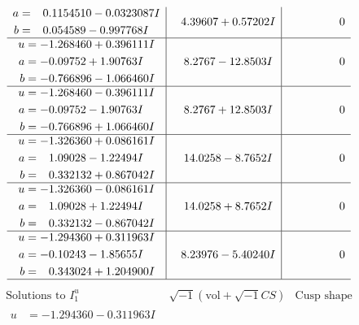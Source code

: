 \documentclass[1p]{elsarticle_modified}
\theoremstyle{definition}
\newcommand{\I}{\sqrt{-1}}
\begin{document}
$$\begin{array}{c|c|c}
\begin{aligned}
a &= \phantom{-}0.1154510 - 0.0323087 I \\
b &= \phantom{-}0.054589 - 0.997768 I\end{aligned}
 & \phantom{-}4.39607 + 0.57202 I & \phantom{-0.000000 } 0 \\ \hline\begin{aligned}
u &= -1.268460 + 0.396111 I \\
a &= -0.09752 + 1.90763 I \\
b &= -0.766896 - 1.066460 I\end{aligned}
 & \phantom{-}8.2767 - 12.8503 I & \phantom{-0.000000 } 0 \\ \hline\begin{aligned}
u &= -1.268460 - 0.396111 I \\
a &= -0.09752 - 1.90763 I \\
b &= -0.766896 + 1.066460 I\end{aligned}
 & \phantom{-}8.2767 + 12.8503 I & \phantom{-0.000000 } 0 \\ \hline\begin{aligned}
u &= -1.326360 + 0.086161 I \\
a &= \phantom{-}1.09028 - 1.22494 I \\
b &= \phantom{-}0.332132 + 0.867042 I\end{aligned}
 & \phantom{-}14.0258 - 8.7652 I & \phantom{-0.000000 } 0 \\ \hline\begin{aligned}
u &= -1.326360 - 0.086161 I \\
a &= \phantom{-}1.09028 + 1.22494 I \\
b &= \phantom{-}0.332132 - 0.867042 I\end{aligned}
 & \phantom{-}14.0258 + 8.7652 I & \phantom{-0.000000 } 0 \\ \hline\begin{aligned}
u &= -1.294360 + 0.311963 I \\
a &= -0.10243 - 1.85655 I \\
b &= \phantom{-}0.343024 + 1.204900 I\end{aligned}
 & \phantom{-}8.23976 - 5.40240 I & \phantom{-0.000000 } 0\\
 \hline 
 \end{array}$$\newpage$$\begin{array}{c|c|c}  
\text{Solutions to }I^u_{1}& \I (\text{vol} + \sqrt{-1}CS) & \text{Cusp shape}\\
 \hline 
\begin{aligned}
u &= -1.294360 - 0.311963 I \\

\end{aligned}
\end{array}$$
\end{document}
